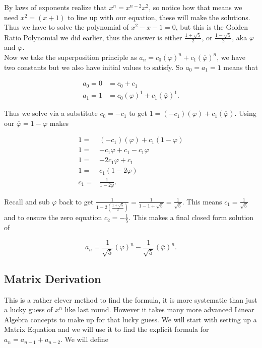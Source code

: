 \documentclass{article}
\begin{document}
By laws of exponents realize that $x^n=x^{n-2}x^2$, so notice how that means we need $x^2=(x+1)$ to line up with our equation, these will make the solutions. Thus we have to solve the polynomial of $x^2-x-1=0$, but this is the Golden Ratio Polynomial we did earlier, thus the answer is either $\frac{1+\sqrt{5}}{2}$, or $\frac{1-\sqrt{5}}{2}$, aka $\varphi$ and $\overline{\varphi}$. \\

Now we take the superposition principle as $a_n=c_0 (\varphi)^n + c_1 (\overline{\varphi})^n$, we have two constants but we also have initial values to satisfy. So $a_0=a_1=1$ means that

\begin{align*}
    a_0=0&=c_0+c_1 \\
    a_1=1&=c_0(\varphi)^1+c_1(\overline{\varphi})^1.
\end{align*}

Thus we solve via a substitute $c_0=-c_1$ to get $1=(-c_1)(\varphi)+c_1(\overline{\varphi})$. Using our $\overline{\varphi}=1-\varphi$ makes

\begin{align*}
    1=&(-c_1)(\varphi)+c_1(1-\varphi) \\
    1=&-c_1\varphi+c_1-c_1\varphi \\
    1=&-2c_1\varphi+c_1 \\
    1=&c_1(1-2\varphi) \\
    c_1=& \frac{1}{1-2\varphi}.
\end{align*}

Recall and sub $\varphi$ back to get $\frac{1}{1-2\left(\frac{1+\sqrt{5}}{2}\right)}=\frac{1}{1-1+\sqrt{5}}=\frac{1}{\sqrt{5}}$. This means $c_1=\frac{1}{\sqrt{5}}$ and to ensure the zero equation $c_2=-\frac{1}{5}$. This makes a final closed form solution of 

\begin{equation*}
    a_n=\frac{1}{\sqrt{5}} (\varphi)^n - \frac{1}{\sqrt{5}} (\overline{\varphi})^n.
\end{equation*}

\subsection{Matrix Derivation}

This is a rather clever method to find the formula, it is more systematic than just a lucky guess of $x^n$ like last round. However it takes many more advanced Linear Algebra concepts to make up for that lucky guess. We will start with setting up a Matrix Equation and we will use it to find the explicit formula for $a_n=a_{n-1}+a_{n-2}$. We will define
\end{document}
